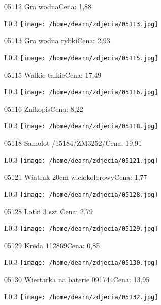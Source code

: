 05112 Gra wodnaCena: 1,88\newline
\begin{wrapfigure}{L}{0.3\textwidth}
\texttt{[image: /home/dearn/zdjecia/05113.jpg]}
\end{wrapfigure}
05113 Gra wodna rybkiCena: 2,93\newline
\begin{wrapfigure}{L}{0.3\textwidth}
\texttt{[image: /home/dearn/zdjecia/05115.jpg]}
\end{wrapfigure}
05115 Walkie talkieCena: 17,49\newline
\begin{wrapfigure}{L}{0.3\textwidth}
\texttt{[image: /home/dearn/zdjecia/05116.jpg]}
\end{wrapfigure}
05116 ZnikopisCena: 8,22\newline
\begin{wrapfigure}{L}{0.3\textwidth}
\texttt{[image: /home/dearn/zdjecia/05118.jpg]}
\end{wrapfigure}
05118 Samolot /15184/ZM3252/Cena: 19,91\newline
\begin{wrapfigure}{L}{0.3\textwidth}
\texttt{[image: /home/dearn/zdjecia/05121.jpg]}
\end{wrapfigure}
05121 Wiatrak 20cm wielokolorowyCena: 1,77\newline
\begin{wrapfigure}{L}{0.3\textwidth}
\texttt{[image: /home/dearn/zdjecia/05128.jpg]}
\end{wrapfigure}
05128 Lotki 3 szt Cena: 2,79\newline
\begin{wrapfigure}{L}{0.3\textwidth}
\texttt{[image: /home/dearn/zdjecia/05129.jpg]}
\end{wrapfigure}
05129 Kreda 112869Cena: 0,85\newline
\begin{wrapfigure}{L}{0.3\textwidth}
\texttt{[image: /home/dearn/zdjecia/05130.jpg]}
\end{wrapfigure}
05130 Wiertarka na baterie 091744Cena: 13,95\newline
\begin{wrapfigure}{L}{0.3\textwidth}
\texttt{[image: /home/dearn/zdjecia/05132.jpg]}
\end{wrapfigure}

